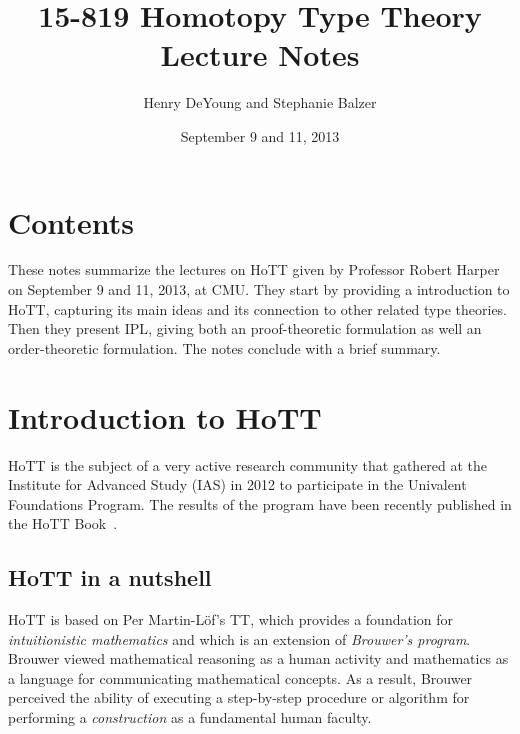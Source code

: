 \documentclass[12pt]{article}
\begin{document}
\title{15-819 Homotopy Type Theory\\ Lecture Notes}
\author{Henry DeYoung and Stephanie Balzer}
\date{September 9 and 11, 2013}

\maketitle





\section{Contents}\label{sec:contents}

These notes summarize the lectures on \ac{HoTT} given by Professor Robert
Harper on September 9 and 11, 2013, at CMU.  They start by providing a introduction to \ac{HoTT},
capturing its main ideas and its connection to other related type theories.  Then they present
\ac{IPL}, giving both an proof-theoretic formulation as
well an order-theoretic formulation.  The notes conclude with a brief summary.


\section{Introduction to \acl{HoTT}}\label{sec:intro}

\Acf{HoTT} is the subject of a very active research community that gathered at the Institute
for Advanced Study (IAS) in 2012 to participate in the Univalent Foundations Program.  The
results of the program have been recently published in the \ac{HoTT} Book~\cite{HoTTBook2013}.

\subsection{\Acs{HoTT} in a nutshell}\label{subsec:hott_in_nutshell}

\Ac{HoTT} is based on Per Martin-L\"{o}f's \acl{TT}, which provides a foundation for
\emph{intuitionistic mathematics} and which is an extension of \emph{Brouwer's program}.
Brouwer viewed mathematical reasoning as a human activity and mathematics as a language for
communicating mathematical concepts.  As a result, Brouwer perceived the ability of executing a
step-by-step procedure or algorithm for performing a \emph{construction} as a fundamental human
faculty.
\end{document}
